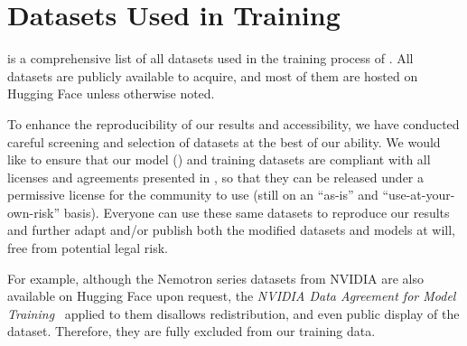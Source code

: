\section{Datasets Used in Training}\label{sec:dataset_used}

 is a comprehensive list of all datasets used in the training process of \fullsys. All datasets are publicly available to acquire, and most of them are hosted on Hugging Face unless otherwise noted.



To enhance the reproducibility of our results and accessibility, we have conducted careful screening and selection of datasets at the best of our ability. We would like to ensure that our model (\sys) and training datasets are compliant with all licenses and agreements presented in , so that they can be released under a permissive license for the community to use (still on an ``as-is'' and ``use-at-your-own-risk'' basis). Everyone can use these same datasets to reproduce our results and further adapt and/or publish both the modified datasets and models at will, free from potential legal risk.

For example, although the Nemotron series datasets from NVIDIA are also available on Hugging Face upon request, the \emph{NVIDIA Data Agreement for Model Training}~\cite{nvidiamodellicense} applied to them disallows redistribution, and even public display of the dataset. Therefore, they are fully excluded from our training data.
